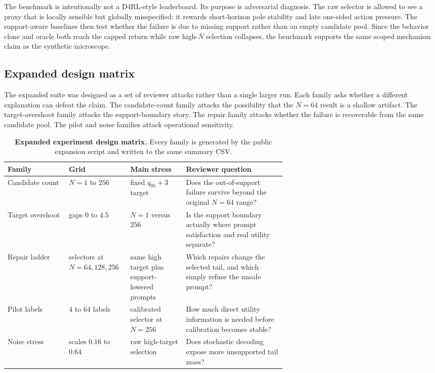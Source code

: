 The benchmark is intentionally not a D4RL-style leaderboard. Its purpose is adversarial diagnosis. The raw selector is allowed to see a proxy that is locally sensible but globally misspecified: it rewards short-horizon pole stability and late one-sided action pressure. The support-aware baselines then test whether the failure is due to missing support rather than an empty candidate pool. Since the behavior clone and oracle both reach the capped return while raw high-$N$ selection collapses, the benchmark supports the same scoped mechanism claim as the synthetic microscope.

\subsection{Expanded design matrix}

The expanded suite was designed as a set of reviewer attacks rather than a single larger run. Each family asks whether a different explanation can defeat the claim. The candidate-count family attacks the possibility that the $N=64$ result is a shallow artifact. The target-overshoot family attacks the support-boundary story. The repair family attacks whether the failure is recoverable from the same candidate pool. The pilot and noise families attack operational sensitivity.

\begin{table}[t]
\centering
\small
\caption{\textbf{Expanded experiment design matrix.} Every family is generated by the public expansion script and written to the same summary CSV.}
\label{tab:design-matrix}
\begin{tabularx}{\linewidth}{p{0.22\linewidth}p{0.22\linewidth}p{0.20\linewidth}X}
\toprule
Family & Grid & Main stress & Reviewer question \\
\midrule
Candidate count & $N=1$ to $256$ & fixed $q_{95}+3$ target & Does the out-of-support failure survive beyond the original $N=64$ range? \\
Target overshoot & gaps $0$ to $4.5$ & $N=1$ versus $256$ & Is the support boundary actually where prompt satisfaction and real utility separate? \\
Repair ladder & selectors at $N=64,128,256$ & same high target plus support-lowered prompts & Which repairs change the selected tail, and which simply refuse the unsafe prompt? \\
Pilot labels & $4$ to $64$ labels & calibrated selector at $N=256$ & How much direct utility information is needed before calibration becomes stable? \\
Noise stress & scales $0.16$ to $0.64$ & raw high-target selection & Does stochastic decoding expose more unsupported tail mass? \\
\bottomrule
\end{tabularx}
\end{table}


